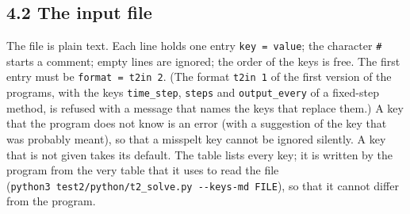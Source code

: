 \documentclass[
  10pt,
]{article}
\begin{document}
\hypertarget{the-input-file}{%
\subsection{4.2 The input file}\label{the-input-file}}

The file is plain text. Each line holds one entry
\texttt{key\ =\ value}; the character \texttt{\#} starts a comment;
empty lines are ignored; the order of the keys is free. The first entry
must be \texttt{format\ =\ t2in\ 2}. (The format \texttt{t2in\ 1} of the
first version of the programs, with the keys \texttt{time\_step},
\texttt{steps} and \texttt{output\_every} of a fixed-step method, is
refused with a message that names the keys that replace them.) A key
that the program does not know is an error (with a suggestion of the key
that was probably meant), so that a misspelt key cannot be ignored
silently. A key that is not given takes its default. The table lists
every key; it is written by the program from the very table that it uses
to read the file
(\texttt{python3\ test2/python/t2\_solve.py\ -\/-keys-md\ FILE}), so
that it cannot differ from the program.
\end{document}
